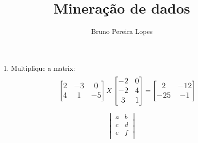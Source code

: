 \documentclass{article}
\title{Mineração de dados}
\author{Bruno Pereira Lopes }
\begin{document}
\maketitle
\begin{enumerate}
\item Multiplique a matrix: \[\large \begin{bmatrix} 2& -3 & 0 \\ 4& 1& -5 \end{bmatrix} X \begin{bmatrix} -2& 0\\ -2& 4\\ 3& 1 \end{bmatrix} = \begin{bmatrix} 2 & -12\\ -25& -1 \end{bmatrix}\]

\end{enumerate}
$$
\begin{vmatrix}
a&b\\
c&d\\
e&f\\
\end{vmatrix}
$$
\end{document}
